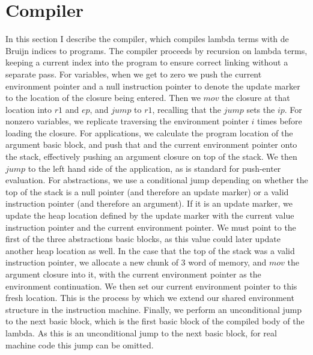 \section{Compiler} \label{sec:compiler}

In this section I describe the compiler, which compiles lambda terms with
de Bruijn indices to programs. The compiler proceeds by recursion on lambda
terms, keeping a current index into the program to ensure correct linking
without a separate pass. For variables, when we get to zero we push the current
environment pointer and a null instruction pointer to denote the update marker
to the location of the closure being entered. Then we $\mathit{mov}$ the closure
at that location into $r1$ and $ep$, and $\mathit{jump}$ to
$r1$, recalling that the $\mathit{jump}$ sets the $ip$. For 
nonzero variables, we replicate traversing the environment pointer $i$
times before loading the closure.  For applications, we calculate the program
location of the argument basic block, and push that and the current environment
pointer onto the stack, effectively pushing an argument closure on top of the
stack. We then $\mathit{jump}$ to the left hand side of the application, as is
standard for push-enter evaluation. For abstractions, we use a conditional jump
depending on whether the top of the stack is a null pointer (and therefore an
update marker) or a valid instruction pointer (and therefore an argument). If it
is an update marker, we update the heap location defined by the update marker
with the current value instruction pointer and the current environment pointer.
We must point to the first of the three abstractions basic blocks, as this value
could later update another heap location as well. In the case that the top of
the stack was a valid instruction pointer, we allocate a new chunk of 3 word of
memory, and $\mathit{mov}$ the argument closure into it, with the current
environment pointer as the environment continuation. We then set our current
environment pointer to this fresh location. This is the process by which we
extend our shared environment structure in the instruction machine. Finally, we
perform an unconditional jump to the next basic block, which is the first basic
block of the compiled body of the lambda. As this is an unconditional jump to
the next basic block, for real machine code this jump can be omitted. 

